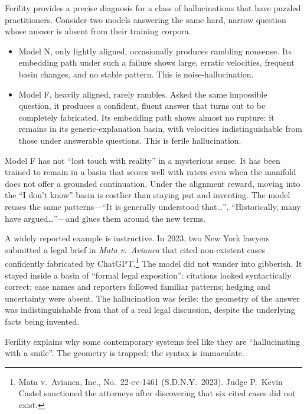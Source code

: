 \documentclass[12pt,a4paper]{article}
\begin{document}
Ferility provides a precise diagnosis for a class of hallucinations that have puzzled practitioners. Consider two models answering the same hard, narrow question whose answer is absent from their training corpora.

\begin{itemize}
  \item Model N, only lightly aligned, occasionally produces rambling nonsense. Its embedding path under such a failure shows large, erratic velocities, frequent basin changes, and no stable pattern. This is noise-hallucination.

  \item Model F, heavily aligned, rarely rambles. Asked the same impossible question, it produces a confident, fluent answer that turns out to be completely fabricated. Its embedding path shows almost no rupture: it remains in its generic-explanation basin, with velocities indistinguishable from those under answerable questions. This is ferile hallucination.
\end{itemize}

Model F has not ``lost touch with reality'' in a mysterious sense. It has been trained to remain in a basin that scores well with raters even when the manifold does not offer a grounded continuation. Under the alignment reward, moving into the ``I don't know'' basin is costlier than staying put and inventing. The model reuses the same patterns---``It is generally understood that\ldots'', ``Historically, many have argued\ldots''---and glues them around the new terms.

A widely reported example is instructive. In 2023, two New York lawyers submitted a legal brief in \emph{Mata v.\ Avianca} that cited non-existent cases confidently fabricated by ChatGPT.\footnote{Mata v.\ Avianca, Inc., No.\ 22-cv-1461 (S.D.N.Y.\ 2023). Judge P.\ Kevin Castel sanctioned the attorneys after discovering that six cited cases did not exist.} The model did not wander into gibberish. It stayed inside a basin of ``formal legal exposition'': citations looked syntactically correct; case names and reporters followed familiar patterns; hedging and uncertainty were absent. The hallucination was ferile: the geometry of the answer was indistinguishable from that of a real legal discussion, despite the underlying facts being invented.

Ferility explains why some contemporary systems feel like they are ``hallucinating with a smile''. The geometry is trapped; the syntax is immaculate.
\end{document}
